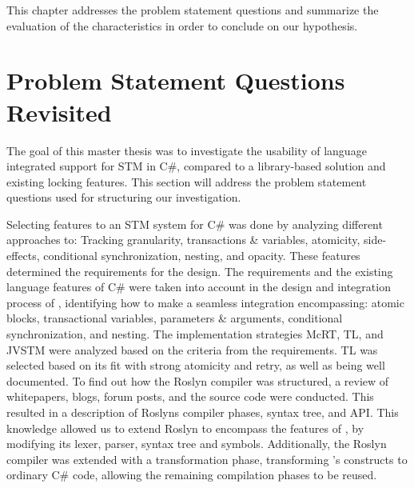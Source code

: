 


This chapter addresses the problem statement questions and summarize the evaluation of the characteristics in order to conclude on our hypothesis. %

\label{chap:conclusion}

\section{Problem Statement Questions Revisited}
The goal of this master thesis was to investigate the usability of language integrated support for \ac{STM} in C\#, compared to a library-based solution and existing locking features. This section will address the problem statement questions used for structuring our investigation.

Selecting features to an \ac{STM} system for C\# was done by analyzing different approaches to: Tracking granularity, transactions \& variables, atomicity, side-effects, conditional synchronization, nesting, and opacity. These features determined the requirements for the design. The requirements and the existing language features of C\# were taken into account in the design and integration process of \stmname, identifying how to make a seamless integration encompassing: atomic blocks, transactional variables, parameters \& arguments, conditional synchronization, and nesting. The implementation strategies McRT, TL, and JVSTM were analyzed based on the criteria from the requirements. TL was selected based on its fit with strong atomicity and retry, as well as being well documented. To find out how the Roslyn compiler was structured, a review of whitepapers, blogs, forum posts, and the source code were conducted. This resulted in a description of Roslyns compiler phases, syntax tree, and \ac{API}. This knowledge allowed us to extend Roslyn to encompass the features of \stmname, by modifying its lexer, parser, syntax tree and symbols. Additionally, the Roslyn compiler was extended with a transformation phase, transforming \stmname's constructs to ordinary C\# code, allowing the remaining compilation phases to be reused.

